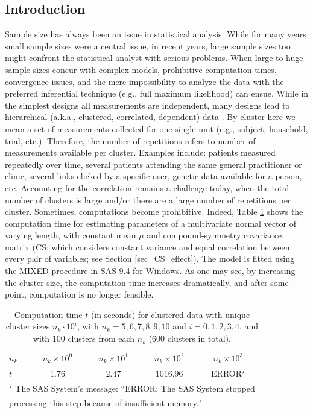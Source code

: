 \documentclass[11pt,a5paper,twoside]{book}
\begin{document}
\label{chap_FIL}

\subsection{Introduction}
\label{sec_introduction}
Sample size has always been an issue in statistical analysis. While for many years small sample sizes were a central issue, in recent years, large sample sizes too might confront the statistical analyst with serious problems. When large to huge sample sizes  concur with complex models, prohibitive computation times, convergence issues, and the mere impossibility to analyze the data with the preferred inferential technique (e.g., full maximum likelihood) can ensue. While in the simplest designs all measurements are independent, many designs lead to hierarchical (a.k.a., clustered, correlated, dependent) data \cite{laird1982,zeger1986,verbeke2009}. By cluster here we mean a set of measurements collected for one single unit (e.g., subject, household, trial, etc.). Therefore, the number of repetitions refers to number of measurements available per cluster. Examples include: patients measured repeatedly over time, several patients attending the same general practitioner or clinic, several links clicked by a specific user, genetic data available for a person, etc. Accounting for the correlation remains a challenge today, when the total number of clusters is large and/or there are a large number of repetitions per cluster. Sometimes, computations become prohibitive. Indeed, Table \ref{tab_sas} shows the computation time for estimating parameters of a multivariate normal vector of varying length, with constant mean $\mu$ and compound-symmetry covariance matrix (CS; which considers constant variance and equal correlation between every pair of variables; see Section \ref{sec_CS_effect}). The model is fitted using the MIXED procedure in SAS 9.4 for Windows. As one may see, by increasing the cluster size, the computation time increases dramatically, and after some point, computation is no longer feasible.
\begin{table}[ht]
\caption{Computation time $t$ (in seconds) for clustered data with unique cluster sizes $n_k\cdot 10^i$, with $n_k=5,6,7,8,9,10$ and $i=0,1,2,3,4$, and with $100$ clusters from each $n_k$ (600 clusters in total).}
\label{tab_sas}
\centering
\begin{tabular}{lcccc}
  \hline \hline
$n_k$ & $n_k\times 10^0$ & $n_k\times 10^1$ & $n_k\times 10^2$ & $n_k\times 10^3$  \\ 

$t$ & 1.76 & 2.47 & 1016.96 & ERROR$^{\star}$ \\ 
   \hline \hline
   \multicolumn{5}{l}{$^{\star}$ The SAS System's message: ``ERROR: The SAS System stopped }\\
   \multicolumn{5}{l}{processing this step because of insufficient memory."}\\
\end{tabular}
\end{table}
\end{document}
